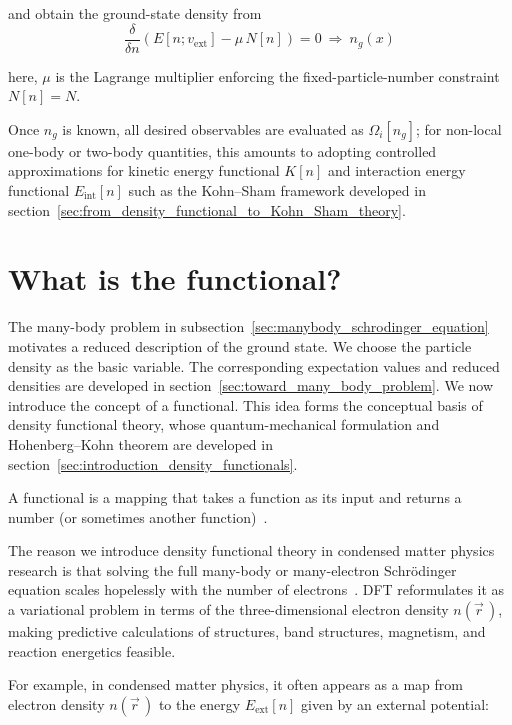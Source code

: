 and obtain the ground-state density from
\begin{equation}
    \frac{\delta}{\delta n}\left(E[n;v_\mathrm{ext}] - \mu\,N[n]\right)=0 \ \Rightarrow\ n_g(x)
\label{ground_state_density}
\end{equation}

here, $\mu$ is the Lagrange multiplier enforcing the fixed-particle-number constraint $N[n]=N$.

Once $n_g$ is known, all desired observables are evaluated as $\Omega_i[n_g]$; 
for non-local one-body or two-body quantities,
this amounts to adopting controlled approximations for kinetic energy functional $K[n]$ and interaction energy functional $E_\mathrm{int}[n]$ such as the Kohn--Sham framework developed in section~\ref{sec:from_density_functional_to_Kohn_Sham_theory}.

\newpage
\section{What is the functional?}
\label{sec:appendix_functionals}

The many-body problem in subsection~\ref{sec:manybody_schrodinger_equation} motivates a reduced description of the ground state.
We choose the particle density as the basic variable.
The corresponding expectation values and reduced densities are developed in section~\ref{sec:toward_many_body_problem}.
We now introduce the concept of a functional.
This idea forms the conceptual basis of density functional theory,
whose quantum-mechanical formulation and Hohenberg--Kohn theorem are developed in section~\ref{sec:introduction_density_functionals}.

A functional is a mapping that takes a function as its input and returns a number (or sometimes another function)~\cite{parr1989density}.

The reason we introduce density functional theory in condensed matter physics research is that solving the full many-body or many-electron Schrödinger equation scales hopelessly with the number of electrons~\cite{becke2014perspective}.
DFT reformulates it as a variational problem in terms of the three-dimensional electron density
$n(\vec{r}\,)$, making predictive calculations of structures, band structures, magnetism, and reaction energetics feasible.

For example, in condensed matter physics, it often appears as a map from electron density $n(\vec{r}\,)$ to the energy $E_\mathrm{ext}[n]$ given by an external potential:

